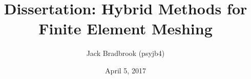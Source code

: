\documentclass{article}
\begin{document}

\title{Dissertation: Hybrid Methods for Finite Element Meshing}
\author{Jack Bradbrook (psyjb4)}
\date{April 5, 2017}
\maketitle

\tableofcontents

\newpage












\end{document}
